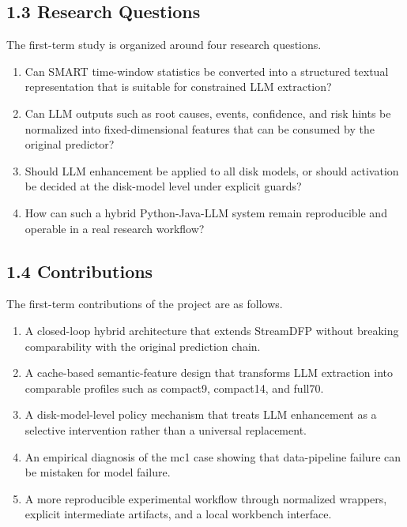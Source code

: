 \documentclass[
  11pt,
  a4paper]{article}
\providecommand{\tightlist}{%
  \setlength{\itemsep}{0pt}\setlength{\parskip}{0pt}}
\begin{document}
\hypertarget{research-questions}{%
\subsection{1.3 Research Questions}\label{research-questions}}

The first-term study is organized around four research questions.

\begin{enumerate}
\def\labelenumi{\arabic{enumi}.}
\tightlist
\item
  Can SMART time-window statistics be converted into a structured
  textual representation that is suitable for constrained LLM
  extraction?
\item
  Can LLM outputs such as root causes, events, confidence, and risk
  hints be normalized into fixed-dimensional features that can be
  consumed by the original predictor?
\item
  Should LLM enhancement be applied to all disk models, or should
  activation be decided at the disk-model level under explicit guards?
\item
  How can such a hybrid Python-Java-LLM system remain reproducible and
  operable in a real research workflow?
\end{enumerate}

\hypertarget{contributions}{%
\subsection{1.4 Contributions}\label{contributions}}

The first-term contributions of the project are as follows.

\begin{enumerate}
\def\labelenumi{\arabic{enumi}.}
\tightlist
\item
  A closed-loop hybrid architecture that extends StreamDFP without
  breaking comparability with the original prediction chain.
\item
  A cache-based semantic-feature design that transforms LLM extraction
  into comparable profiles such as compact9, compact14, and full70.
\item
  A disk-model-level policy mechanism that treats LLM enhancement as a
  selective intervention rather than a universal replacement.
\item
  An empirical diagnosis of the mc1 case showing that data-pipeline
  failure can be mistaken for model failure.
\item
  A more reproducible experimental workflow through normalized wrappers,
  explicit intermediate artifacts, and a local workbench interface.
\end{enumerate}
\end{document}
